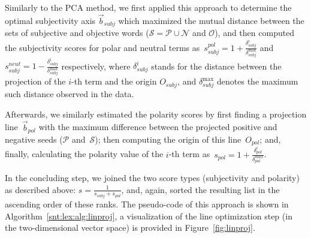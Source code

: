 Similarly to the PCA method, we first applied this approach to
determine the optimal subjectivity axis $\vec{b}_{subj}$ which
maximized the mutual distance between the sets of subjective and
objective words ($\mathcal{S} = \mathcal{P} \cup \mathcal{N}$ and
$\mathcal{O}$), and then computed the subjectivity scores for polar
and neutral terms
as~$s^{pol}_{subj} = 1 + \frac{\delta_{subj}^i}{\delta_{subj}^{\max}}$ and
$s^{neut}_{subj} = 1 - \frac{\delta_{subj}^i}{\delta_{subj}^{\max}}$
respectively, where $\delta_{subj}^i$ stands for the distance between
the projection of the $i$-th term and the origin $O_{subj}$, and
$\delta_{subj}^{\max}$ denotes the maximum such distance observed in
the data.

Afterwards, we similarly estimated the polarity scores by first
finding a projection line~$\vec{b}_{pol}$ with the maximum difference
between the projected positive and negative seeds ($\mathcal{P}$
and~$\mathcal{S}$); then computing the origin of this line~$O_{pol}$;
and, finally, calculating the polarity value of the $i$-th term
as~$s_{pol} = 1 + \frac{\delta^i_{pol}}{\delta^{max}_{pol}}$.

In the concluding step, we joined the two score types (subjectivity
and polarity) as described above: $s = \frac{1}{s_{subj} + s_{pol}}$,
and, again, sorted the resulting list in the ascending order of these
ranks.  The pseudo-code of this approach is shown in
Algorithm~\ref{snt:lex:alg:linproj}, a visualization of the line
optimization step (in the two-dimensional vector space) is provided in
Figure~\ref{fig:linproj}.

